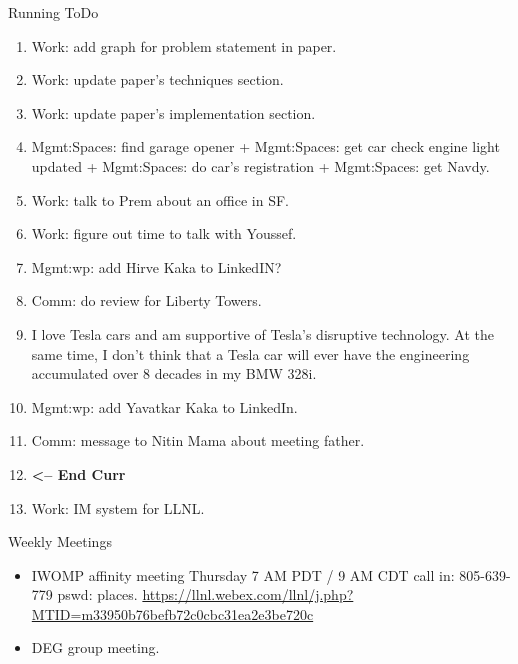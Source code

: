 \begin{columns}
\begin{column}{0.5\linewidth}
\begin{block}{Running ToDo}
\begin{enumerate}
          \item \tiny Work: add graph for problem statement in paper. 
          \item \tiny Work: update paper's techniques section. 
          \item \tiny Work: update paper's implementation section. 
          \item \tiny Mgmt:Spaces: find garage opener + Mgmt:Spaces:
            get car check engine light updated + Mgmt:Spaces: do car's
            registration + Mgmt:Spaces: get Navdy.

          \item \tiny Work: talk to Prem about an office in SF. 
          \item \tiny Work: figure out time to talk with Youssef.
          \item \tiny Mgmt:wp: add Hirve Kaka to LinkedIN?

          \item \tiny Comm: do review for Liberty Towers.

          

          \item \tiny I love Tesla cars and am supportive of Tesla’s 
            disruptive technology. At the same time, I don’t think
            that a Tesla car will ever have the engineering
            accumulated over 8 decades in my BMW 328i.
            
            \item \tiny Mgmt:wp: add Yavatkar Kaka to LinkedIn. 

          \item \tiny Comm: message to Nitin Mama about meeting father.
                    
  
\item \tiny \textbf{ <-- End Curr } 

\item \tiny Work: IM system for LLNL. 

        \end{enumerate}
      \end{block}
 

      \begin{block}{Weekly Meetings}
        \begin{itemize}
          \tiny \item \tiny IWOMP affinity meeting Thursday 7 AM PDT / 9 AM
          CDT call in: 805-639-779 pswd: places. \url{https://llnl.webex.com/llnl/j.php?MTID=m33950b76befb72c0cbc31ea2e3be720c}
        \item \tiny DEG group meeting.  
        \end{itemize}
      \end{block} 



\end{column}
\end{columns}

